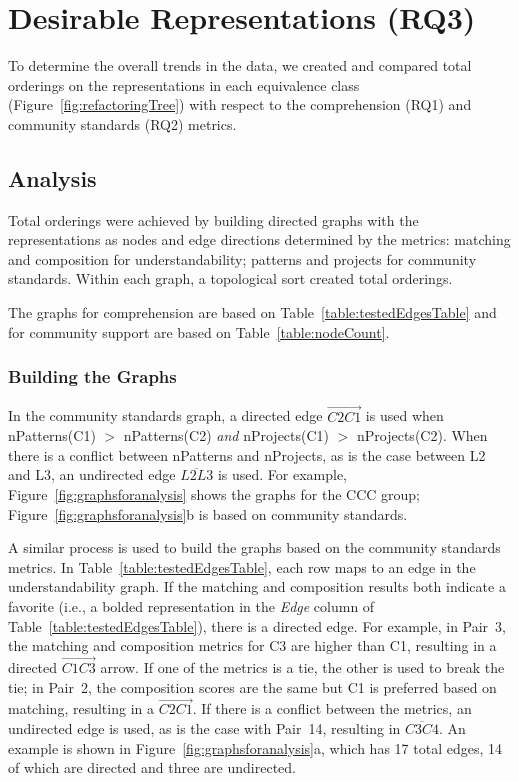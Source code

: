 

\section{Desirable Representations (RQ3)}
\label{sec:rq3}
To determine the overall trends in the data, we created and compared total orderings on the representations in each equivalence class (Figure~\ref{fig:refactoringTree})  with respect to the comprehension (RQ1) and community standards (RQ2)   metrics.

\subsection{Analysis}
Total orderings were achieved by building directed graphs with the representations as nodes and edge directions determined by the metrics: matching and composition for understandability;  patterns and projects for community standards. Within each graph, a topological sort created total  orderings.

The graphs for comprehension are based on Table~\ref{table:testedEdgesTable} and for community support are based on Table~\ref{table:nodeCount}. 



\subsubsection{Building the Graphs}
In the community standards graph, a directed edge  $\overrightarrow{C2  C1}$ is used when  nPatterns(C1) $>$ nPatterns(C2) \emph{and}  nProjects(C1) $>$ nProjects(C2).
When there is a conflict between nPatterns and nProjects, as is the case between L2 and L3, 
an undirected edge $\overline{L2L3}$ is used. %
For example, Figure~\ref{fig:graphsforanalysis} shows the graphs for  the CCC group; Figure~\ref{fig:graphsforanalysis}b is based  on community standards. 

A similar process is used to build the graphs based on the community standards metrics. 
In Table~\ref{table:testedEdgesTable}, each row maps to an edge in the understandability graph. 
If the matching and composition results both indicate a favorite (i.e., a bolded representation in the {\em Edge} column of Table~\ref{table:testedEdgesTable}), there is a directed edge. For example, in Pair~3, the matching and composition metrics for C3 are higher than C1, resulting in a directed $\overrightarrow{C1  C3}$ arrow. If one of the metrics is a tie, the other is used to break the tie; in Pair~2, the composition scores are the same but C1 is preferred based on matching, resulting in a $\overrightarrow{C2  C1}$. If there is a conflict between the metrics, an undirected edge is used, as is the case with Pair~14, resulting in $\overline{C3 C4}$.
An example is shown in Figure~\ref{fig:graphsforanalysis}a, which has 17 total edges, 14 of which are directed and three are undirected. 


